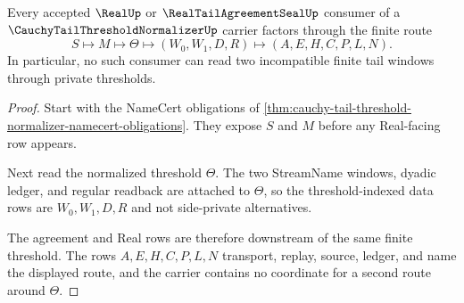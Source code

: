 \begin{theorem}
\label{thm:cauchy-tail-threshold-normalizer-route-exhaustion}
Every accepted $\RealUp$ or $\RealTailAgreementSealUp$ consumer of a $\CauchyTailThresholdNormalizerUp$ carrier factors through the finite route
$$
S\longmapsto M\longmapsto\Theta\longmapsto(W_0,W_1,D,R)\longmapsto(A,E,H,C,P,L,N).
$$
In particular, no such consumer can read two incompatible finite tail windows through private thresholds.
\end{theorem}
\begin{proof}
Start with the NameCert obligations of \autoref{thm:cauchy-tail-threshold-normalizer-namecert-obligations}. They expose $S$ and $M$ before any Real-facing row appears.

Next read the normalized threshold $\Theta$. The two StreamName windows, dyadic ledger, and regular readback are attached to $\Theta$, so the threshold-indexed data rows are $W_0,W_1,D,R$ and not side-private alternatives.

The agreement and Real rows are therefore downstream of the same finite threshold. The rows $A,E,H,C,P,L,N$ transport, replay, source, ledger, and name the displayed route, and the carrier contains no coordinate for a second route around $\Theta$.
\end{proof}

